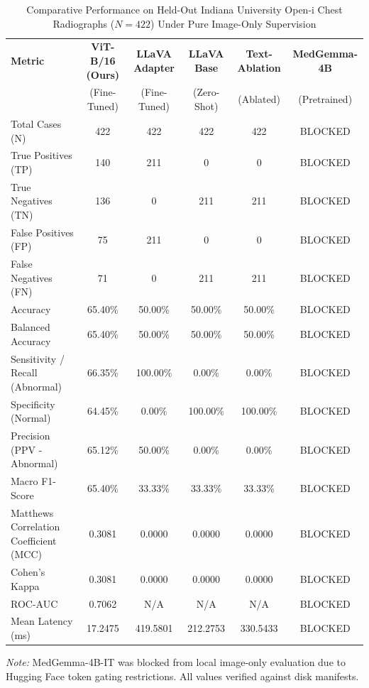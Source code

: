 \begin{table}[t]
\centering
\caption{Comparative Performance on Held-Out Indiana University Open-i Chest Radiographs ($N = 422$) Under Pure Image-Only Supervision}
\label{tab:vit_image_only_comparison}
\begin{tabular}{lccccc}
\toprule
\textbf{Metric} & \textbf{ViT-B/16 (Ours)} & \textbf{LLaVA Adapter} & \textbf{LLaVA Base} & \textbf{Text-Ablation} & \textbf{MedGemma-4B} \\
& (Fine-Tuned) & (Fine-Tuned) & (Zero-Shot) & (Ablated) & (Pretrained) \\
\midrule
Total Cases (N) & 422 & 422 & 422 & 422 & BLOCKED \\
True Positives (TP) & 140 & 211 & 0 & 0 & BLOCKED \\
True Negatives (TN) & 136 & 0 & 211 & 211 & BLOCKED \\
False Positives (FP) & 75 & 211 & 0 & 0 & BLOCKED \\
False Negatives (FN) & 71 & 0 & 211 & 211 & BLOCKED \\
Accuracy & 65.40\% & 50.00\% & 50.00\% & 50.00\% & BLOCKED \\
Balanced Accuracy & 65.40\% & 50.00\% & 50.00\% & 50.00\% & BLOCKED \\
Sensitivity / Recall (Abnormal) & 66.35\% & 100.00\% & 0.00\% & 0.00\% & BLOCKED \\
Specificity (Normal) & 64.45\% & 0.00\% & 100.00\% & 100.00\% & BLOCKED \\
Precision (PPV - Abnormal) & 65.12\% & 50.00\% & 0.00\% & 0.00\% & BLOCKED \\
Macro F1-Score & 65.40\% & 33.33\% & 33.33\% & 33.33\% & BLOCKED \\
Matthews Correlation Coefficient (MCC) & 0.3081 & 0.0000 & 0.0000 & 0.0000 & BLOCKED \\
Cohen's Kappa & 0.3081 & 0.0000 & 0.0000 & 0.0000 & BLOCKED \\
ROC-AUC & 0.7062 & N/A & N/A & N/A & BLOCKED \\
Mean Latency (ms) & 17.2475 & 419.5801 & 212.2753 & 330.5433 & BLOCKED \\
\bottomrule
\end{tabular}
\vspace{1ex}
{\footnotesize \textit{Note:} MedGemma-4B-IT was blocked from local image-only evaluation due to Hugging Face token gating restrictions. All values verified against disk manifests.}
\end{table}
